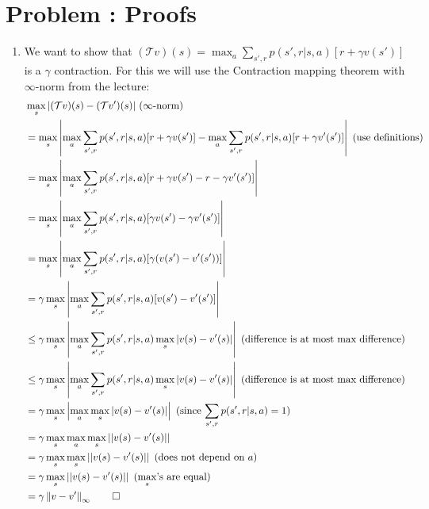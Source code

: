 \documentclass[12pt]{scrartcl}
\newcounter{exnum}
\newcommand{\exercise}[1]{\section*{Problem \theexnum\stepcounter{exnum}: #1}}
\begin{document}
\setcounter{exnum}{1}
\exercise{Proofs}

\begin{enumerate}
      \item We want to show that $(\mathcal{T}v)(s) = \max_a \sum_{s', r} p(s', r | s, a)[r + \gamma v(s')]$ is a $\gamma$ contraction.
            For this we will use the Contraction mapping theorem with $\infty$-norm from the lecture:
            \begin{align*}
                  &\max_s|(\mathcal{T}v)(s) - (\mathcal{T}v')(s)| \text{  ($\infty$-norm)} \\
                  &= \max_s \left|\max_a \sum_{s', r} p(s', r | s, a)[r + \gamma v(s')] - \max_a \sum_{s', r} p(s', r | s, a)[r + \gamma v'(s')] \right| \text{  (use definitions)} \\
                  &= \max_s \left|\max_a \sum_{s', r} p(s', r | s, a)[r + \gamma v(s') - r - \gamma v'(s')] \right| \\
                  &= \max_s \left|\max_a \sum_{s', r} p(s', r | s, a)[\gamma v(s') - \gamma v'(s')] \right| \\
                  &= \max_s \left|\max_a \sum_{s', r} p(s', r | s, a)[\gamma (v(s') - v'(s'))] \right| \\
                  &= \gamma \max_s \left|\max_a \sum_{s', r} p(s', r | s, a)[v(s') - v'(s')] \right| \\
                  &\le \gamma \max_s \left|\max_a \sum_{s', r} p(s', r | s, a) \max_s |v(s) - v'(s)| \right| \text{  (difference is at most max difference)} \\
                  &\le \gamma \max_s \left|\max_a \sum_{s', r} p(s', r | s, a) \max_s |v(s) - v'(s)| \right| \text{  (difference is at most max difference)} \\
                  &= \gamma \max_s \left|\max_a \max_s |v(s) - v'(s)| \right| \text{  (since $\sum_{s', r} p(s', r | s, a) = 1$)} \\
                  &= \gamma \max_s \max_a \max_s \left||v(s) - v'(s)| \right| \\
                  &= \gamma \max_s \max_s \left||v(s) - v'(s)| \right| \text{  (does not depend on $a$)} \\
                  &= \gamma \max_s \left||v(s) - v'(s)| \right| \text{  ($\max_s$'s are equal)} \\
                  &= \gamma \left\| v - v' \right\|_\infty \qed
            \end{align*}


\end{enumerate}
\end{document}
